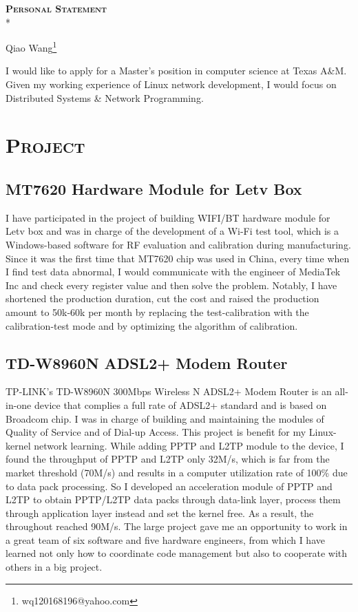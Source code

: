 \documentclass{article}
\begin{document}
	\begin{center}
		\textsc{\textbf{{\LARGE{}Personal Statement}}}\\*
	\end{center}
	\begin{center}
		Qiao Wang\footnote{wq120168196@yahoo.com}
	\end{center}
	
	\begin{multicols}{2}
		I would like to apply for a Master's position in computer science at Texas A\&M. Given my working experience of Linux network development, I would focus on Distributed Systems \& Network Programming.
		\section{\textsc{Project}}
		\subsection{MT7620 Hardware Module for Letv Box}
		I have participated in the project of building WIFI/BT hardware module for Letv box and was in charge of the development of a Wi-Fi test tool, which is a Windows-based software for RF evaluation and calibration during manufacturing. Since it was the first time that MT7620 chip was used in China, every time when I find test data abnormal, I would communicate with the engineer of MediaTek Inc and check every register value and then solve the problem. Notably, I have shortened the production duration, cut the cost and raised the production amount to 50k-60k per month by replacing the test-calibration with the calibration-test mode and by optimizing the algorithm of calibration.
		\subsection{TD-W8960N ADSL2+ Modem Router}
		TP-LINK’s TD-W8960N 300Mbps Wireless N ADSL2+ Modem Router is an all-in-one device that complies a full rate of ADSL2+ standard and is based on Broadcom chip. I was in charge of building and maintaining the modules of Quality of Service and of Dial-up Access. This project is benefit for my Linux-kernel network learning. While adding PPTP and L2TP module to the device, I found the throughput of PPTP and L2TP only 32M/s, which is far from the market threshold (70M/s) and results in a computer utilization rate of 100\% due to data pack processing. So I developed an acceleration module of PPTP and L2TP to obtain PPTP/L2TP data packs through data-link layer, process them through application layer instead and set the kernel free. As a result, the throughout reached 90M/s. The large project gave me an opportunity to work in a great team of six software and five hardware engineers, from which I have learned not only how to coordinate code management but also to cooperate with others in a big project.

\end{multicols}
\end{document}
